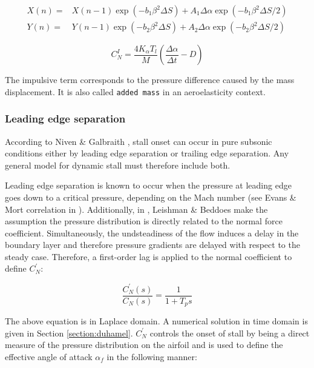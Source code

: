 \begin{eqnarray}
X(n)= & X(n-1) \exp \left(-b_{1} \beta^{2} \Delta S\right)+A_{1} \Delta \alpha \exp \left(-b_{1} \beta^{2} \Delta S / 2\right) \\
Y(n)= & Y(n-1) \exp \left(-b_{2} \beta^{2} \Delta S\right)+A_{2} \Delta \alpha \exp \left(-b_{2} \beta^{2} \Delta S / 2\right)
\end{eqnarray}

\begin{equation}
C_{N}^{I}=\frac{4 K_{\alpha} T_{l}}{M}\left(\frac{\Delta \alpha}{\Delta t}-D\right)
\label{eq:impulsive}
\end{equation}

 The impulsive term corresponds to the pressure difference caused by the mass displacement. It is also called \texttt{added mass} in an aeroelasticity context.

\subsubsection{Leading edge separation}

According to Niven \& Galbraith \cite{niven_modelling_1997}, stall onset can occur in pure subsonic conditions either by leading edge separation or trailing edge separation. Any general model for dynamic stall must therefore include both. 

Leading edge separation is known to occur when the pressure at leading edge goes down to a critical pressure, depending on the Mach number (see Evans \& Mort correlation in \cite{sheng_new_2006}). Additionally, in \cite{leishman_semi-empirical_1989}, Leishman \& Beddoes make the assumption the pressure distribution is directly related to the normal force coefficient. Simultaneously, the undsteadiness of the flow induces a delay in the boundary layer and therefore pressure gradients are delayed with respect to the steady case. Therefore, a first-order lag is applied to the normal coefficient to define $C_N^{\prime}$:

\begin{equation}
\frac{C_N^{\prime}(s)}{C_N(s)} = \frac{1}{1+T_p s}
\label{eq:cnprime_laplace}  
\end{equation}

The above equation is in Laplace domain. A numerical solution in time domain is given in Section \ref{section:duhamel}. $C_N^{\prime}$ controls the onset of stall by being a direct measure of the pressure distribution on the airfoil and is used to define the effective angle of attack $\alpha_f$ in the following manner:


